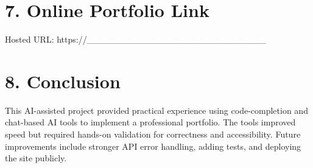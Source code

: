\documentclass[11pt,a4paper]{article}
\begin{document}
\section*{7. Online Portfolio Link}
Hosted URL: https://____________________________

\section*{8. Conclusion}
This AI-assisted project provided practical experience using code-completion and chat-based AI tools to implement a professional portfolio. The tools improved speed but required hands-on validation for correctness and accessibility. Future improvements include stronger API error handling, adding tests, and deploying the site publicly.
\end{document}
